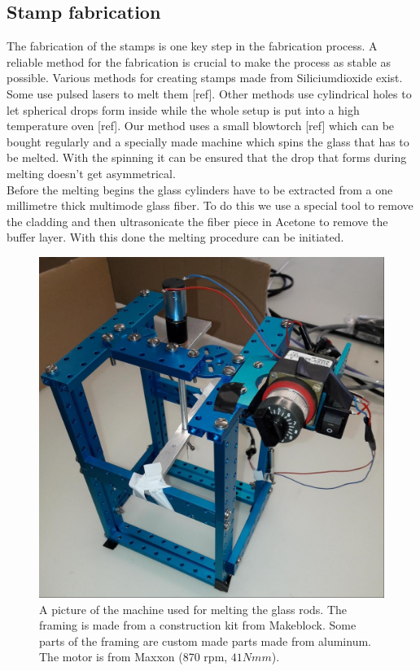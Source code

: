 \subsection{Stamp fabrication}
The fabrication of the stamps is one key step in the fabrication process. A reliable method for the fabrication is crucial to make the process as stable as possible. Various methods for creating stamps made from Siliciumdioxide exist. Some use pulsed lasers to melt them [ref]. Other methods use cylindrical holes to let spherical drops form inside while the whole setup is put into a high temperature oven [ref]. Our method uses a small blowtorch [ref] which can be bought regularly and a specially made machine which spins the glass that has to be melted. With the spinning it can be ensured that the drop that forms during melting doesn't get asymmetrical.\\
Before the melting begins the glass cylinders have to be extracted from a one millimetre thick multimode glass fiber. To do this we use a special tool to remove the cladding and then ultrasonicate the fiber piece in Acetone to remove the buffer layer. With this done the melting procedure can be initiated.
\begin{figure}[H]
	\includegraphics[scale=0.3]{source/melting_machine}
	\caption{A picture of the machine used for melting the glass rods. The framing is made from a construction kit from Makeblock. Some parts of the framing are custom made parts made from aluminum. The motor is from Maxxon (870 rpm, $41 \si{Nmm}$).}
	\label{Fig:Melting_machine}
\end{figure}
